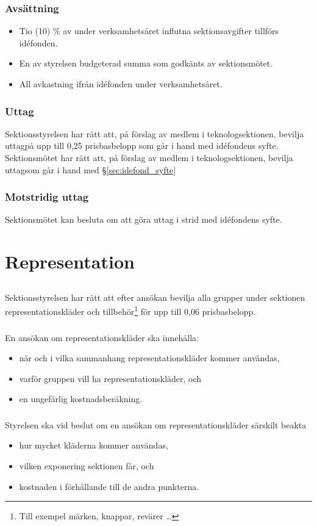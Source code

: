 \documentclass[a4paper, 10pt]{article}
\begin{document}
\subsubsection{Avsättning}
\begin{itemize}
\item Tio (10) \% av under verksamhetsåret influtna sektionsavgifter tillförs idéfonden.
\item En av styrelsen budgeterad summa som godkänts av sektionsmötet.
\item All avkastning ifrån idéfonden under verksamhetsåret.
\end{itemize}
\subsubsection{Uttag}
Sektionsstyrelsen har rätt att, på förslag av medlem i teknologsektionen, bevilja uttagpå upp till 0,25 prisbasbelopp som går i hand med idéfondens syfte. Sektionsmötet har rätt att, på förslag av medlem i teknologsektionen, bevilja uttagsom går i hand med \S\ref{sec:idefond_syfte}
\subsubsection{Motstridig uttag}
Sektionsmötet kan besluta om att göra uttag i strid med idéfondens syfte.

\section{Representation}
\subsection{}
Sektionsstyrelsen har rätt att efter ansökan bevilja alla grupper under
sektionen representationskläder och tillbehör\footnote{Till exempel märken,
knappar, revärer \dots} för upp till 0,06 prisbasbelopp.

\subsubsection{}
En ansökan om representationskläder ska innehålla:
\begin{itemize}
  \item när och i vilka sammanhang representationskläder kommer användas,
  \item varför gruppen vill ha representationskläder, och
  \item en ungefärlig kostnadsberäkning.
\end{itemize}
\subsubsection{}
Styrelsen ska vid beslut om en ansökan om representationskläder särskilt beakta
\begin{itemize}
  \item hur mycket kläderna kommer användas,
  \item vilken exponering sektionen får, och
  \item kostnaden i förhållande till de andra punkterna.
\end{itemize}
\end{document}
